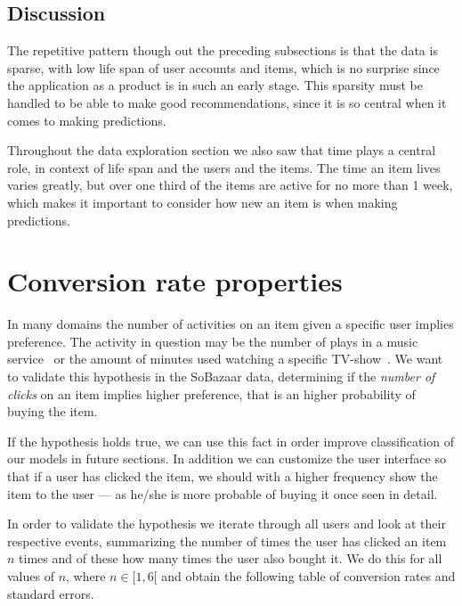 \subsection{Discussion}
    The repetitive pattern though out the preceding subsections is that the data is sparse, with low life span of user accounts and items, which is no surprise since the application as a product is in such an early stage.
    This sparsity must be handled to be able to make good recommendations, since it is so central when it comes to making predictions.

    Throughout the data exploration section we also saw that time plays a central role, in context of life span and the users and the items.
    The time an item lives varies greatly, but over one third of the items are active for no more than 1 week, which makes it important to consider how new an item is when making predictions.


\section{Conversion rate properties}
\label{sec:conv-rate}

In many domains the number of activities on an item given a specific user
implies preference. The activity in question may be the number of plays in a
music service~\cite{parra2011walk} or the amount of minutes used watching a
specific TV-show~\cite{study-on-implicit-tv}. We want to validate this
hypothesis in the SoBazaar data, determining if the \textit{number of clicks}
on an item implies higher preference, that is an higher probability of buying
the item.



If the hypothesis holds true, we can use this fact in order improve
classification of our models in future sections. In addition we can customize
the user interface so that if a user has clicked the item, we should with a
higher frequency show the item to the user --- as he/she is more probable of
buying it once seen in detail.

In order to validate the hypothesis we iterate through all users and look at
their respective events, summarizing the number of times the user has clicked
an item $n$ times and of these how many times the user also bought it. We do
this for all values of $n$, where $n \in [1,6[$ and obtain the following table
of conversion rates and standard errors.

